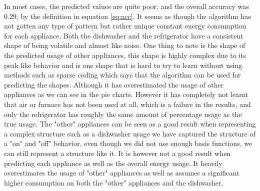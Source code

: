 In most cases, the predicted values are quite poor, and the overall accuracy was 0.29, by the definition in equation \ref{eq:acc}. It seems as though the algorithm has not gotten any type of pattern but rather unique constant energy consumption for each appliance. Both the dishwasher and the refrigerator have a consistent shape of being volatile and almost like noise. One thing to note is the shape of the predicted usage of other appliances, this shape is highly complex due to its peak like behavior and is one shape that is hard to try to learn without using methods such as sparse coding which says that the algorithm can be used for predicting the shapes. Although it has overestimated the usage of other appliances as we can see in the pie charts. However it has completely not learnt that air or furnace has not been used at all, which is a failure in the results, and only the refrigerator has roughly the same amount of percentage usage as the true usage. The "other" appliances can be seen as a good result when representing a complex structure such as a dishwasher usage we have captured the structure of a "on" and "off" behavior, even though we did not use enough basis functions, we can still represent a structure like it. It is however not a good result when predicting each appliance as well as the overall energy usage. It heavily overestimates the usage of "other" appliances as well as assumes a significant higher consumption on both the "other" appliances and the dishwasher. 

